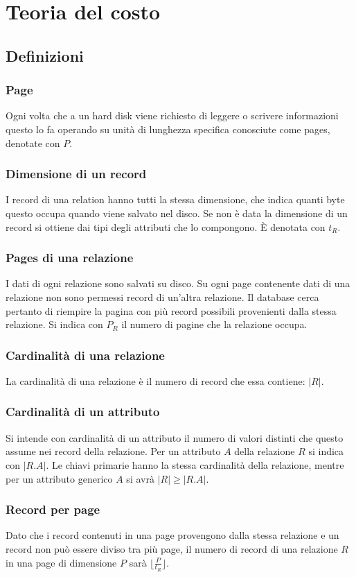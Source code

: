\chapter{Teoria del costo}
\section{Definizioni}
\subsection{Page}
Ogni volta che a un hard disk viene richiesto di leggere o scrivere informazioni questo lo fa operando su unit\`a di lunghezza specifica conosciute come 
pages, denotate con $P$.
\subsection{Dimensione di un record}
I record di una relation hanno tutti la stessa dimensione, che indica quanti byte questo occupa quando viene salvato nel disco. Se non \`e data la dimensione
di un record si ottiene dai tipi degli attributi che lo compongono. \`E denotata con $t_R$.
\subsection{Pages di una relazione}
I dati di ogni relazione sono salvati su disco. Su ogni page contenente dati di una relazione non sono permessi record di un'altra relazione. 
Il database cerca pertanto di riempire la pagina con pi\`u record possibili provenienti dalla stessa relazione. Si indica con $P_R$ il numero di pagine che
la relazione occupa.
\subsection{Cardinalit\`a di una relazione}
La cardinalit\`a di una relazione \`e il numero di record che essa contiene: $|R|$.
\subsection{Cardinalit\`a di un attributo}
Si intende con cardinalit\`a di un attributo il numero di valori distinti che questo assume nei record della relazione. Per un attributo $A$ della relazione
$R$ si indica con $|R.A|$. Le chiavi primarie hanno la stessa cardinalit\`a della relazione, mentre per un attributo generico $A$ si avr\`a $|R|\ge|R.A|$.
\subsection{Record per page}
Dato che i record contenuti in una page provengono dalla stessa relazione e un record non pu\`o essere diviso tra pi\`u page, il numero di record di una relazione $R$ in
una page di dimensione $P$ sar\`a $\lfloor\frac{P}{t_R}\rfloor$.
